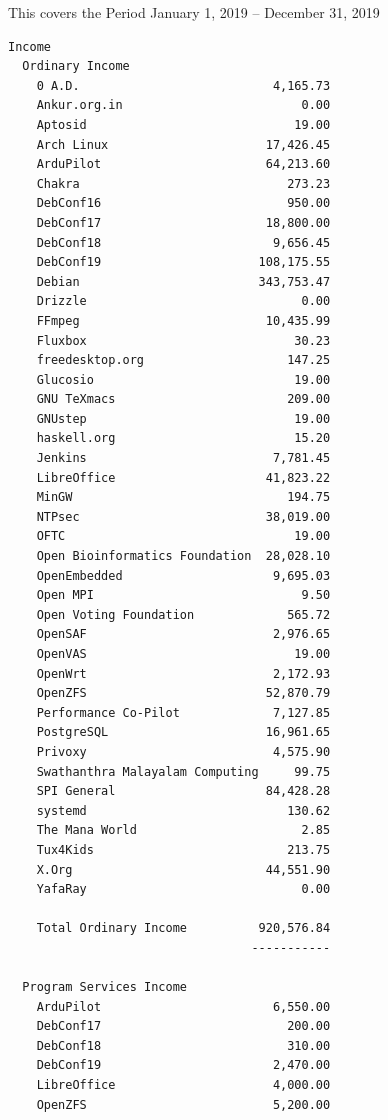 \documentclass[a4paper]{report}
\begin{document}
This covers the Period January 1, 2019 -- December 31, 2019

\begin{verbatim}
Income
  Ordinary Income
    0 A.D.                           4,165.73
    Ankur.org.in                         0.00
    Aptosid                             19.00
    Arch Linux                      17,426.45
    ArduPilot                       64,213.60
    Chakra                             273.23
    DebConf16                          950.00
    DebConf17                       18,800.00
    DebConf18                        9,656.45
    DebConf19                      108,175.55
    Debian                         343,753.47
    Drizzle                              0.00
    FFmpeg                          10,435.99
    Fluxbox                             30.23
    freedesktop.org                    147.25
    Glucosio                            19.00
    GNU TeXmacs                        209.00
    GNUstep                             19.00
    haskell.org                         15.20
    Jenkins                          7,781.45
    LibreOffice                     41,823.22
    MinGW                              194.75
    NTPsec                          38,019.00
    OFTC                                19.00
    Open Bioinformatics Foundation  28,028.10
    OpenEmbedded                     9,695.03
    Open MPI                             9.50
    Open Voting Foundation             565.72
    OpenSAF                          2,976.65
    OpenVAS                             19.00
    OpenWrt                          2,172.93
    OpenZFS                         52,870.79
    Performance Co-Pilot             7,127.85
    PostgreSQL                      16,961.65
    Privoxy                          4,575.90
    Swathanthra Malayalam Computing     99.75
    SPI General                     84,428.28
    systemd                            130.62
    The Mana World                       2.85
    Tux4Kids                           213.75
    X.Org                           44,551.90
    YafaRay                              0.00

    Total Ordinary Income          920,576.84
                                  -----------

  Program Services Income
    ArduPilot                        6,550.00
    DebConf17                          200.00
    DebConf18                          310.00
    DebConf19                        2,470.00
    LibreOffice                      4,000.00
    OpenZFS                          5,200.00


\end{verbatim}
\end{document}
